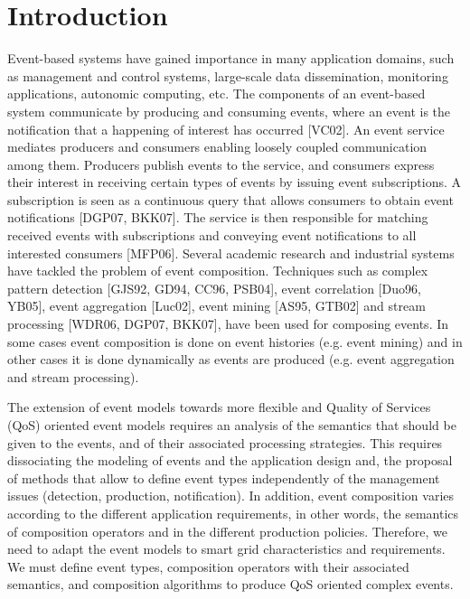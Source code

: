 \chapter{Introduction}
\label{chap:intro}

Event-based systems have gained importance in many application domains, such as management and control systems, large-scale data dissemination, monitoring applications, autonomic computing, etc. The components of an event-based system communicate by producing and consuming events, where an event is the notification that a happening of interest has occurred [VC02]. An event service mediates producers and consumers enabling loosely coupled communication among them. Producers publish events to the service, and consumers express their interest in receiving certain types of events by issuing event subscriptions. A subscription is seen as a continuous query that allows consumers to obtain event notifications [DGP07, BKK07]. The service is then responsible for matching received events with subscriptions and conveying event notifications to all interested consumers [MFP06]. Several academic research and industrial systems have tackled the problem of event composition. Techniques such as complex pattern detection [GJS92, GD94, CC96, PSB04], event correlation [Duo96, YB05], event aggregation [Luc02], event mining [AS95, GTB02] and stream processing [WDR06, DGP07, BKK07], have been used for composing events. In some cases event composition is done on event histories (e.g. event mining) and in other cases it is done dynamically as events are produced (e.g. event aggregation and stream processing). 

The extension of event models towards more flexible and Quality of Services (QoS) oriented event models requires an analysis of the semantics that should be given to the events, and of their associated processing strategies. This requires dissociating the modeling of events and the application design and, the proposal of methods that allow to define event types independently of the management issues (detection, production, notification). In addition, event composition varies according to the different application requirements, in other words, the semantics of composition operators and in the different production policies. Therefore, we need to adapt the event models to smart grid characteristics and requirements. We must define event types, composition operators with their associated semantics, and composition algorithms to produce QoS oriented complex events.
